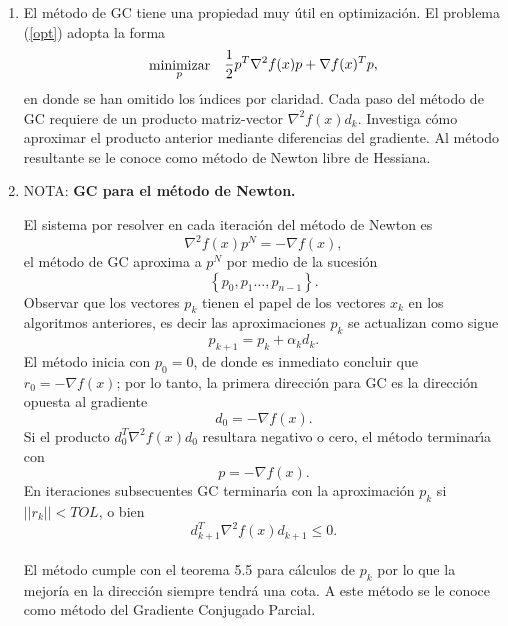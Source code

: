 \documentclass[12pt]{article}
\newcommand{\bea}{\begin{eqnarray}}
\newcommand{\eea}{\end{eqnarray}}
\begin{document}
\begin{enumerate}
\begin{itemize}
  $$-1+\frac{2\lambda}{\lambda_1+\lambda_{n-k}}\ $$\\
  $$\quad  (1-\frac{2\lambda}{\lambda_1+\lambda_{n-k}})$$ \\
  \item Para el intervalo que va de $\left[ \frac{\lambda_1+ \lambda_{n-k}}{2}, \lambda_{n-k}\right]$ pasa justo lo contrario, como las dos curvas se cruzan (el polinomio y la linea) en el mismo punto (la ra\'iz), se necesitar\'ia que hubieran dos cambios de signo en $dq(\lambda)$ para que la linea recta terminara abajo del polinomio, pero como s\'olo hay una ra\'iz de $dq(\lambda)$ en ese intervalo, eso no sucede. Por lo tanto, la linea $-1+\frac{2\lambda}{\lambda_1+\lambda_{n-k}}\ $  \quad $\quad  (1-\frac{2\lambda}{\lambda_1+\lambda_{n-k}})$ va por arriba (abajo) de $q(\lambda)$ en ese intervalo.
  \item Juntando los dos intervalos, se llega a la conclusi\'on de que:  $$|q(\lambda)| \le \left|1 - \frac{2\lambda}{\lambda_1 + \lambda_{n-m}}\right| \ \ \ \ \ \ \text{en el intervalo $[\lambda_1, \lambda_{n-k}]$} \qed_{Teo_{5.5}}$$
 \end{itemize}
 
 \item El m\'etodo de GC tiene una propiedad muy \'util en optimizaci\'on. El problema  (\ref{opt}) adopta la forma
 \bea  \label{opt_mod}
  \stackrel{\mbox{minimizar}}{ {}_p } & & \raisebox{1.0ex}{$\displaystyle  \frac{1}{2} p^T \nabla^2 f(x) p +  \nabla f(x)^Tp$,}
 \eea
 en donde se han omitido los \'{\i}ndices por claridad. Cada paso del m\'etodo de GC requiere de un producto matriz-vector $\nabla^2 f(x) d_k$. Investiga c\'omo aproximar el producto anterior mediante diferencias del gradiente. Al m\'etodo resultante se le conoce como m\'etodo de Newton libre de Hessiana.
 

 
 \item NOTA: 
 {\bf GC para el m\'etodo de Newton.} 

 El sistema por resolver en cada iteraci\'on del m\'etodo de Newton es
 \[
    \nabla^2 f(x) p^N = -\nabla f(x),
 \]
 el m\'etodo de GC aproxima a $p^N$ por medio de la sucesi\'on 
 \[
   \left \{ p_0,  p_1 \ldots,  p_{n-1} \right \}.
 \]
 Observar que los vectores $p_k$ tienen el papel de los vectores $x_k$ en los algoritmos anteriores, es decir las aproximaciones $p_k$ se actualizan como sigue
 \[
    p_{k+1} = p_k + \alpha_k d_k.
 \] 
 El m\'etodo inicia con  $p_0 = 0$, de donde es inmediato concluir que $r_0 = -\nabla f(x)$; por lo tanto,  la primera direcci\'on para GC es la direcci\'on opuesta al gradiente
\[
   d_0 = - \nabla f(x).
\]
Si el producto $d_0^T \nabla^2 f(x) d_0$ resultara negativo o cero, el m\'etodo terminar\'{\i}a con
\[ 
  p = -\nabla f(x).
\]
En iteraciones subsecuentes GC terminar\'{\i}a con la aproximaci\'on $p_k$  si $||r_k|| < TOL$, o bien 
\[
     d_{k+1}^T \nabla^2 f(x) d_{k+1} \le 0. 
\]\\
El m\'etodo cumple con el teorema 5.5 para c\'alculos de $p_k$ por lo que la mejor\'ia en la direcci\'on siempre tendr\'a una cota. A este m\'etodo se le conoce como m\'etodo del Gradiente Conjugado Parcial. 




\end{enumerate}
\end{document}

